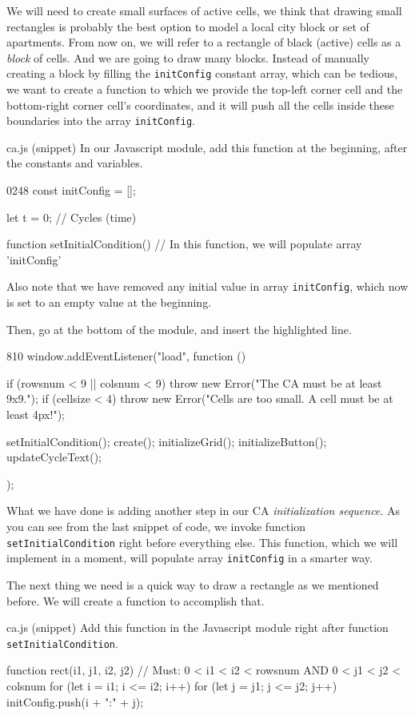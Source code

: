 We will need to create small surfaces of active cells, we think that drawing small rectangles
is probably the best option to model a local city block or set of apartments. 
From now on, we will refer to a rectangle of black (active) cells as a \textit{block} of cells.
And we are going to draw many blocks. Instead of manually creating a block by filling the
\texttt{initConfig} constant array, which can be tedious, we want to create a function
to which we provide the top-left corner cell and the bottom-right corner cell's coordinates, and it
will push all the cells inside these boundaries into the array \texttt{initConfig}.

\begin{programcode}{ca.js (snippet)}
In our Javascript module, add this function at the beginning, after the constants and variables.
\begin{codeh2}{0}{2}{4}{8}
const initConfig = [];

let t = 0; // Cycles (time)

function setInitialCondition() {
    // In this function, we will populate array 'initConfig'
}
\end{codeh2}
Also note that we have removed any initial value in array \texttt{initConfig}, which now is set
to an empty value at the beginning.

Then, go at the bottom of the module, and insert the highlighted line.
\begin{codeh1}{8}{10}
window.addEventListener("load", function () {
  if (rowsnum < 9 || colsnum < 9) {
    throw new Error("The CA must be at least 9x9.");
  }
  if (cellsize < 4) {
    throw new Error("Cells are too small. A cell must be at least 4px!");
  }

  setInitialCondition();
  create();
  initializeGrid();
  initializeButton();
  updateCycleText();
});
\end{codeh1}
\end{programcode}

What we have done is adding another step in our CA \textit{initialization sequence}. As you can see from
the last snippet of code, we invoke function \texttt{setInitialCondition} right before everything
else. This function, which we will implement in a moment, will populate array \texttt{initConfig}
in a smarter way.

The next thing we need is a quick way to draw a rectangle as we mentioned before. We will create
a function to accomplish that.

\begin{programcode}{ca.js (snippet)}
Add this function in the Javascript module right after function \texttt{setInitialCondition}.
\begin{code}
function rect(i1, j1, i2, j2) {
  // Must: 0 < i1 < i2 < rowsnum AND 0 < j1 < j2 < colsnum
  for (let i = i1; i <= i2; i++) {
    for (let j = j1; j <= j2; j++) {
      initConfig.push(i + ":" + j);
    }
  }
}
\end{code}
\end{programcode}

